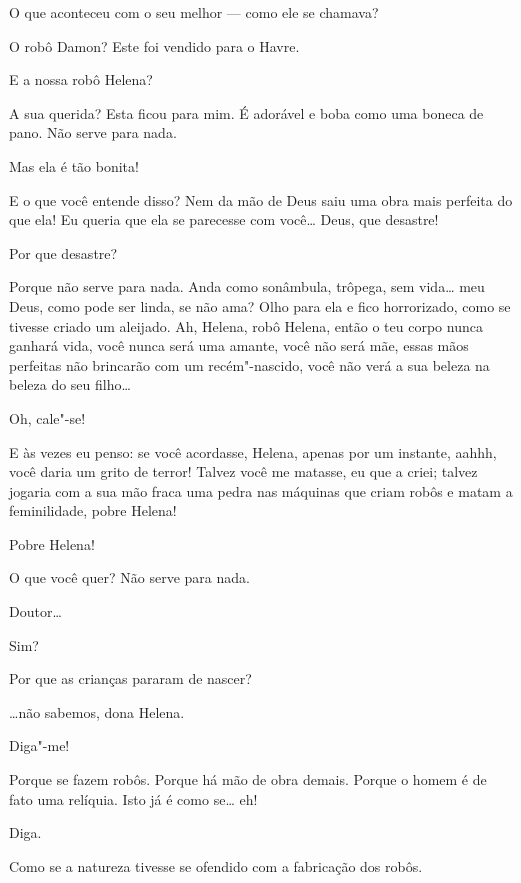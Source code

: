  O que aconteceu com o seu melhor --- como ele se chamava?

 O robô Damon? Este foi vendido para o Havre.

 E a nossa robô Helena?

 A sua querida? Esta ficou para mim. É adorável e boba como uma boneca de pano. 
Não serve para nada.


 Mas ela é tão bonita!

 E o que você entende disso? Nem da mão de Deus saiu uma obra mais
perfeita do que ela! Eu queria que ela se parecesse com você\ldots{} Deus, que desastre!

 Por que desastre?

 Porque não serve para nada. Anda como sonâmbula, trôpega, sem vida\ldots{}
meu Deus, como pode ser linda, se não ama? Olho para ela e fico horrorizado,
como se tivesse criado um aleijado. Ah, Helena, robô Helena, então o teu corpo
nunca ganhará vida, você nunca será uma amante, você não será mãe, essas mãos
perfeitas não brincarão com um recém"-nascido, você não verá a sua beleza na
beleza do seu filho\ldots{}

  Oh, cale"-se!

 E às vezes eu penso: se você acordasse, Helena, apenas por um
instante, aahhh, você daria um grito de terror! Talvez você me matasse, eu que
a criei; talvez jogaria com a sua mão fraca uma pedra nas máquinas que criam
robôs e matam a feminilidade, pobre Helena!

 Pobre Helena!

 O que você quer? Não serve para nada.


 Doutor\ldots{}

 Sim?

 Por que as crianças pararam de nascer?

 \ldots{}não sabemos, dona Helena.

 Diga"-me!

 Porque se fazem robôs. Porque há mão de obra demais. Porque o homem é
de fato uma relíquia. Isto já é como se\ldots{} eh!

 Diga.

 Como se a natureza tivesse se ofendido com a fabricação dos robôs.

